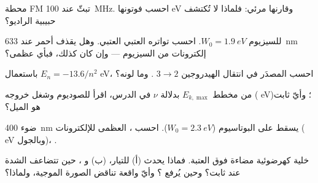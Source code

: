 \begin{exercise}[$\star$]\label{exo:g12:quantum-world:2}
محطة FM تبثّ عند \qty{100}{MHz}. احسب  فوتونها 
\unit{eV} وقارنها  مرئي: فلماذا لا تُكتشف حبيبية الراديو؟
\end{exercise}

\begin{exercise}[$\star$]\label{exo:g12:quantum-world:3}
للسيزيوم $W_0 = \qty{1.9}{eV}$. احسب تواتره العتبي 
العتبي. وهل يقذف  أحمر عند \qty{633}{nm} إلكترونات من السيزيوم ---
وإن كان كذلك، فبأي  عظمى؟
\end{exercise}

\begin{exercise}[$\star$]\label{exo:g12:quantum-world:4}
باستعمال $E_n = -13.6/n^2$ \unit{eV}، احسب   المصدَر
في انتقال الهيدروجين $3 \to 2$ . وما لونه؟
\end{exercise}

\begin{exercise}[$\star$]\label{exo:g12:quantum-world:5}
من مخطط $E_{k,\max}$ بدلالة $\nu$ في الدرس، اقرأ  للصوديوم وشغل خروجه ( \unit{eV})؛ وأيّ ثابت هو الميل؟
\end{exercise}

\begin{exercise}[$\star\star$]\label{exo:g12:quantum-world:6}
ضوء  \qty{400}{nm} يسقط على البوتاسيوم ($W_0 = \qty{2.3}{eV}$).
احسب  ،  العظمى للإلكترونات
( \unit{eV} وبالجول)، .
\end{exercise}

\begin{exercise}[$\star\star$]\label{exo:g12:quantum-world:7}
خلية كهرضوئية مضاءة فوق العتبة. فماذا يحدث (أ) للتيار، (ب) و
، حين تتضاعف الشدة عند  ثابت؟ وحين
يُرفع ؟ وأيّ واقعة تناقض الصورة الموجية، ولماذا؟
\end{exercise}

